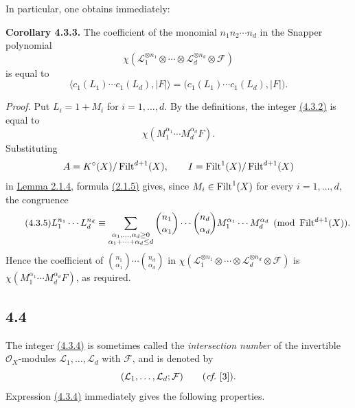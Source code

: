 In particular, one obtains immediately:

\textbf{Corollary 4.3.3.}
The coefficient of the monomial $n_1n_2\cdots n_d$ in the Snapper polynomial
\[
\chi(\mathcal L_1^{\otimes n_1}\otimes\cdots\otimes
\mathcal L_d^{\otimes n_d}\otimes\mathcal F)
\]
is equal to
\begin{equation}\tag{4.3.4}
\bigl\langle c_1(L_1)\cdots c_1(L_d),\lvert F\rvert\bigr\rangle
=\bigl(c_1(L_1)\cdots c_1(L_d),\lvert F\rvert\bigr).
\end{equation}

\emph{Proof.}
Put $L_i=1+M_i$ for $i=1,\ldots,d$. By the definitions, the integer \hyperlink{sga6.e10.eq.4-3-2}{(4.3.2)}
is equal to
\[
\chi(M_1^{\alpha_1}\cdots M_d^{\alpha_d}F).
\]
Substituting
\[
A=K^\circ(X)/\operatorname{Filt}^{d+1}(X),
\qquad I=\operatorname{Filt}^1(X)/\operatorname{Filt}^{d+1}(X)
\]
in \hyperlink{sga6.e10.lem.2-1-4}{Lemma 2.1.4}, formula \hyperlink{sga6.e10.eq.2-1-5}{(2.1.5)} gives, since
$M_i\in\operatorname{Filt}^1(X)$ for every $i=1,\ldots,d$, the congruence
\begin{equation}\tag{4.3.5}
L_1^{n_1}\cdots L_d^{n_d}\equiv
\sum_{\substack{\alpha_1,\ldots,\alpha_d\geq0\\
\alpha_1+\cdots+\alpha_d\leq d}}
\binom{n_1}{\alpha_1}\cdots\binom{n_d}{\alpha_d}
M_1^{\alpha_1}\cdots M_d^{\alpha_d}
\pmod{\operatorname{Filt}^{d+1}(X)}.
\end{equation}
Hence the coefficient of
$\binom{n_1}{\alpha_1}\cdots\binom{n_d}{\alpha_d}$ in
$\chi(\mathcal L_1^{\otimes n_1}\otimes\cdots\otimes
\mathcal L_d^{\otimes n_d}\otimes\mathcal F)$ is
$\chi(M_1^{\alpha_1}\cdots M_d^{\alpha_d}F)$, as required.

\subsection*{4.4}
The integer \hyperlink{sga6.e10.eq.4-3-4}{(4.3.4)} is sometimes called the \emph{intersection number} of the
invertible $\mathcal O_X$-modules $\mathcal L_1,\ldots,\mathcal L_d$ with
$\mathcal F$, and is denoted by
\[
(\mathcal L_1,\ldots,\mathcal L_d;\mathcal F)
\qquad(\emph{cf.}~[3]).
\]
Expression \hyperlink{sga6.e10.eq.4-3-4}{(4.3.4)} immediately gives the following properties.


